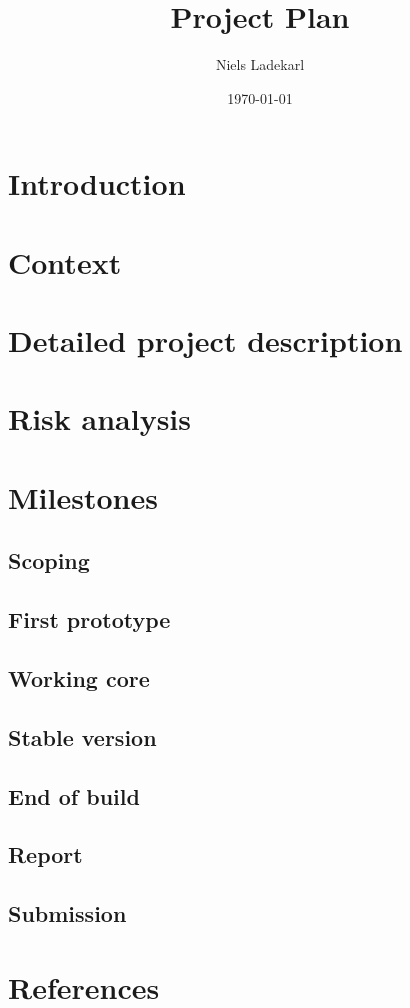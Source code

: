 \documentclass{article}
\title{Project Plan}
\author{Niels Ladekarl}
\date{\today}
\begin{document}
\maketitle

\tableofcontents

\section{Introduction}
\section{Context}
\section{Detailed project description}
\section{Risk analysis}
\section{Milestones}
\subsection{Scoping}
\subsection{First prototype}
\subsection{Working core}
\subsection{Stable version}
\subsection{End of build}
\subsection{Report}
\subsection{Submission}
\section*{References}
\end{document}
